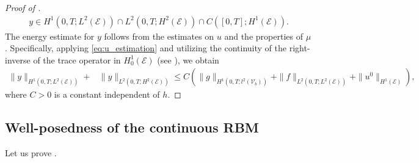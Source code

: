 \documentclass[10pt,a4paper]{amsart}
\begin{document}
\begin{proof}[Proof of ]
\begin{align*}
        y \in H^1(0,T; L^2(\mathcal{E})) \cap L^2(0,T; H^2(\mathcal{E})) \cap C([0,T]; H^1(\mathcal{E})).
    \end{align*}
    The energy estimate for $y$ follows from the estimates on $u$ and the properties of $\mu$. Specifically, applying \eqref{eq:u_estimation} and utilizing the continuity of the right-inverse of the trace operator in $H_0^1(\mathcal{E})$ (see \cite[Chapter I, Theorem 8.3]{lions_book}), we obtain
    \begin{align*}
        \|y\|_{H^1(0,T; L^2(\mathcal{E}))} +&\|y\|_{L^2(0,T; H^2(\mathcal{E}))}\leq C \left( \|g\|_{H^1(0,T; l^2(\mathcal{V}_b))} + \|f\|_{L^2(0,T; L^2(\mathcal{E}))} + \|u^0\|_{H^1(\mathcal{E})} \right),
    \end{align*}
    where $C > 0$ is a constant independent of $h$.
\end{proof}


 \subsection{Well-posedness of the continuous RBM}\label{sec:well-posed-random}

Let us prove .
\end{document}
